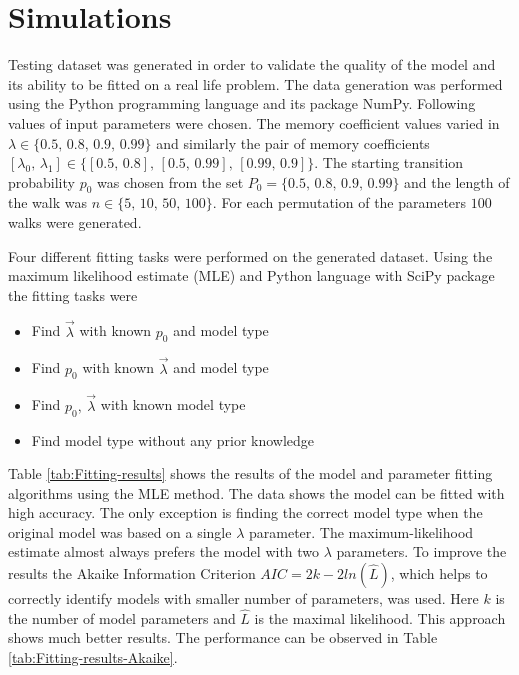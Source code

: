 \documentclass{amsart}
\theoremstyle{definition}
\theoremstyle{plain}
\theoremstyle{plain}
\numberwithin{equation}{section}
\begin{document}
\section{Simulations\label{sec:Simulations}}

Testing dataset was generated in order to validate the quality of
the model and its ability to be fitted on a real life problem. The
data generation was performed using the Python programming language
and its package NumPy. Following values of input parameters were chosen.
The memory coefficient values varied in $\lambda\in\{0.5,\,0.8,\,0.9,\,0.99\}$
and similarly the pair of memory coefficients $[\lambda_{0},\,\lambda_{1}]\in\{[0.5,\,0.8],\,[0.5,\,0.99],\,[0.99,\,0.9]\}$.
The starting transition probability $p_{0}$ was chosen from the set
$P_{0}=\{0.5,\,0.8,\,0.9,\,0.99\}$ and the length of the walk was
\textbf{$n\in\{5,\,10,\,50,\,100\}$}. For each permutation of the
parameters $100$ walks were generated.

Four different fitting tasks were performed on the generated dataset.
Using the maximum likelihood estimate (MLE) \cite{rossi2018mathematical}
and Python language with SciPy package the fitting tasks were

\begin{itemize}
\item Find $\overrightarrow{\lambda}$ with known $p_{0}$ and model type
\item Find $p_{0}$ with known $\overrightarrow{\lambda}$ and model type
\item Find $p_{0},\,\overrightarrow{\lambda}$ with known model type
\item Find model type without any prior knowledge
\end{itemize}

Table \ref{tab:Fitting-results} shows the results of the model and
parameter fitting algorithms using the MLE method. The data shows
the model can be fitted with high accuracy. The only exception is
finding the correct model type when the original model was based on
a single $\lambda$ parameter. The maximum-likelihood estimate almost
always prefers the model with two $\lambda$ parameters. To improve
the results the Akaike Information Criterion $AIC=2k-2ln(\hat{L})$,
which helps to correctly identify models with smaller number of parameters,
was used. Here $k$ is the number of model parameters and $\hat{L}$
is the maximal likelihood. This approach shows much better results.
The performance can be observed in Table \ref{tab:Fitting-results-Akaike}.
\end{document}
